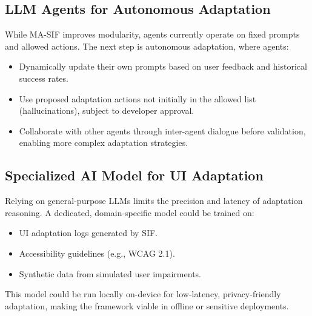 \documentclass[openany]{book}
\begin{document}
\subsection{LLM Agents for Autonomous Adaptation}
While MA-SIF improves modularity, agents currently operate on fixed prompts and allowed actions. The next step is autonomous adaptation, where agents:
\begin{itemize}
    \item Dynamically update their own prompts based on user feedback and historical success rates.
    \item Use proposed adaptation actions not initially in the allowed list (hallucinations), subject to developer approval.
    \item Collaborate with other agents through inter-agent dialogue before validation, enabling more complex adaptation strategies.
\end{itemize}

\subsection{Specialized AI Model for UI Adaptation}
Relying on general-purpose LLMs limits the precision and latency of adaptation reasoning. A dedicated, domain-specific model could be trained on:
\begin{itemize}
    \item UI adaptation logs generated by SIF.
    \item Accessibility guidelines (e.g., WCAG 2.1).
    \item Synthetic data from simulated user impairments.
\end{itemize}
This model could be run locally on-device for low-latency, privacy-friendly adaptation, making the framework viable in offline or sensitive deployments.
\end{document}

